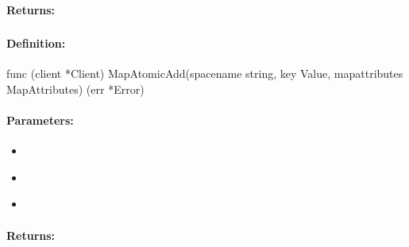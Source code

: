 \paragraph{Returns:}


\pagebreak
\subsubsection{}
\label{api:Go:MapAtomicAdd}


\paragraph{Definition:}
\begin{gocode}
func (client *Client) MapAtomicAdd(spacename string, key Value, mapattributes MapAttributes) (err *Error)
\end{gocode}

\paragraph{Parameters:}
\begin{itemize}[noitemsep]
\item {}\\

\item {}\\

\item {}\\

\end{itemize}

\paragraph{Returns:}


\pagebreak
\subsubsection{}
\label{api:Go:CondMapAtomicAdd}


